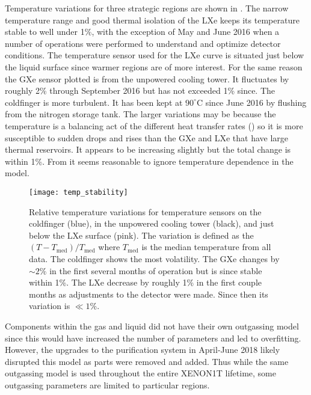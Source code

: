 Temperature variations for three strategic regions are shown in .  The
narrow temperature range and good thermal isolation of the LXe keeps its temperature stable to well under 1\%, with the exception of May
and June 2016 when a number of operations were performed to understand and optimize detector conditions.  The temperature sensor used for
the
LXe curve is situated just below the liquid surface since warmer regions are of more interest.  For the same reason the GXe sensor plotted
is from the unpowered cooling tower.  It fluctuates by roughly 2\% through September 2016 but has not exceeded 1\% since.  The 
coldfinger is more turbulent.  It has been kept at $90^{\circ}\mathrm{C}$
since June 2016 by flushing  from the nitrogen storage tank.  The larger variations may be because the temperature is a
balancing act of the
different heat transfer rates () so it is more susceptible to sudden drops and
rises than the GXe and LXe that have large thermal reservoirs.  It appears to be increasing slightly but the total change is within
1\%.  From  it seems reasonable to ignore temperature dependence in the model.

\begin{figure}
\centering
\texttt{[image: temp\_stability]}
\caption{Relative temperature variations for temperature sensors on the  coldfinger (blue), in the unpowered cooling
tower (black), and just below the LXe surface (pink).  The variation is defined as the $(T - T_{\mathrm{med}}) / T_{\mathrm{med}}$ where
$T_{\mathrm{med}}$ is the median temperature from all data.  The  coldfinger shows the most volatility.  The GXe changes by
${\sim}2\%$ in the first several months of operation but is since stable within 1\%.  The LXe decrease by roughly 1\% in the first couple
months as adjustments to the detector were made.  Since then its variation is $\ll 1\%$.}
\label{fig:electron_lifetime_model_outgassing_temp_stability}
\end{figure}

Components within the gas and liquid did not have their own outgassing model since this would have increased the number of
parameters and led to overfitting.  However, the upgrades to the purification system in April-June 2018 likely disrupted this model
as parts were removed and added.  Thus while the same outgassing model is used throughout the entire XENON1T lifetime, some outgassing
parameters are limited to particular regions.

